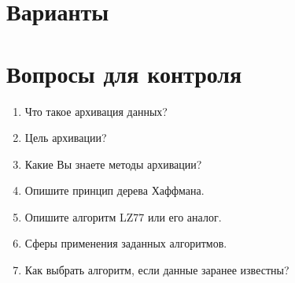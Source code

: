 \section{Варианты}\label{sect8_d}
%
\section{Вопросы для контроля}\label{sect8_e}
%
\begin{enumerate}
  \item Что такое архивация данных?
  \item Цель архивации?
  \item Какие Вы знаете методы архивации?
  \item Опишите принцип дерева Хаффмана.
  \item Опишите алгоритм LZ77 или его аналог.
  \item Сферы применения заданных алгоритмов.
  \item Как выбрать алгоритм, если данные заранее известны?
\end{enumerate}
